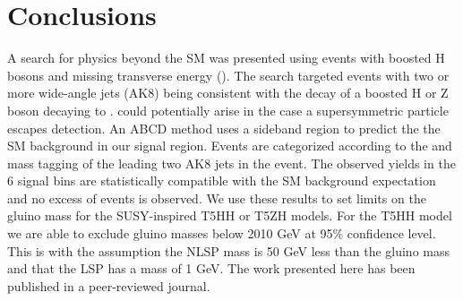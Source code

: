 \section{Conclusions}
A search for physics beyond the SM was presented using events with boosted H bosons and missing transverse energy (\ptmiss). The search targeted events with two or more wide-angle jets (AK8) being consistent with the decay of a boosted H or Z boson decaying to \bbbar. \ptmiss could potentially arise in the case a supersymmetric particle escapes detection. An ABCD method uses a sideband region to predict the the SM background in our signal region. Events are categorized according to the \bbbar and mass tagging of the leading two AK8 jets in the event. The observed yields in the 6 signal bins are statistically compatible with the SM background expectation and no excess of events is observed. We use these results to set limits on the gluino mass for the SUSY-inspired T5HH or T5ZH models. For the T5HH model we are able to exclude gluino masses below 2010 GeV at 95\% confidence level. This is with the assumption the NLSP mass is 50 GeV less than the gluino mass and that the LSP has a mass of 1 GeV. The work presented here has been published in a peer-reviewed journal\cite{CMS-SUS-17-006}.
